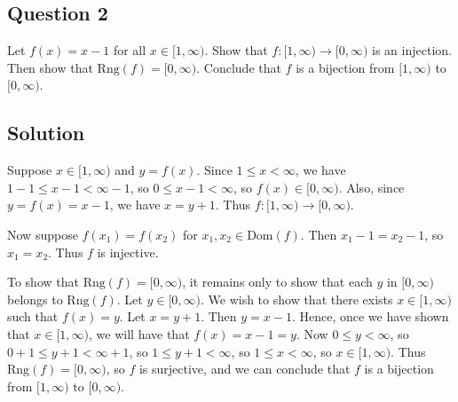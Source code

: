 \documentclass{article}
\begin{document}
\subsection*{Question 2}
    Let $f(x) = x - 1$ for all $x \in [1, \infty)$. Show that $f: [1, \infty) \rightarrow [0, \infty)$ is an injection. Then show that $\text{Rng}(f) = [0, \infty)$. Conclude that $f$ is a bijection from $[1, \infty)$ to $[0, \infty)$.

\subsection*{Solution}
    Suppose $x \in [1, \infty)$ and $y = f(x)$. Since $1 \le x < \infty$, we have $1 - 1 \le x - 1 < \infty - 1$, so $0 \le x - 1 < \infty$, so $f(x) \in [0, \infty)$. Also, since $y = f(x) = x - 1$, we have $x = y + 1$. Thus $f: [1, \infty) \rightarrow [0, \infty)$.
    
    \vspace{1.5mm}
    Now suppose $f(x_{1}) = f(x_{2})$ for $x_{1}, x_{2} \in \text{Dom}(f)$. Then $x_{1} - 1 = x_{2} - 1$, so $x_{1} = x_{2}$. Thus $f$ is injective.
        
    \vspace{1.5mm} To show that $\text{Rng}(f) = [0, \infty)$, it remains only to show that each $y$ in $[0, \infty)$ belongs to $\text{Rng}(f)$. Let $y \in [0, \infty)$. We wish to show that there exists $x \in [1, \infty)$ such that $f(x) = y$. Let $x = y + 1$. Then $y = x - 1$. Hence, once we have shown that $x \in [1, \infty)$, we will have that $f(x) = x - 1 = y$. Now $0 \le y < \infty$, so $0 + 1 \le y + 1 < \infty + 1$, so $1 \le y + 1 < \infty$, so $1 \le x < \infty$, so $x \in [1, \infty)$. Thus $\text{Rng}(f) = [0, \infty)$, so $f$ is surjective, and we can conclude that $f$ is a bijection from $[1, \infty)$ to $[0, \infty)$.
\end{document}
